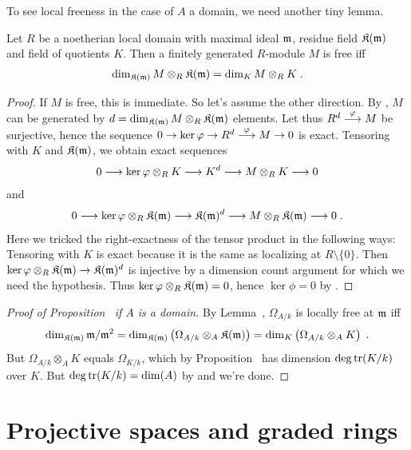 \documentclass[a4paper,parskip=half,numbers=enddot, DIV=12]{scrreprt}
\begin{document}
To see local freeness in the case of $A$ a domain, we need another tiny lemma.
\begin{lem}
	Let $R$ be a noetherian local domain with maximal ideal $\mathfrak{m}$, residue field $\mathfrak{K}(\mathfrak{m})$ and field of quotients $K$. Then a finitely generated $R$-module $M$ is free iff 
	\begin{align*}
		\dim_{\mathfrak{K}(\mathfrak{m})}M\otimes_R\mathfrak{K}(\mathfrak{m})=\dim_KM\otimes_RK\;.
	\end{align*}
\end{lem}
\begin{proof}
	If $M$ is free, this is immediate. So let's assume the other direction. By \NAK, $M$ can be generated by $d=\dim_{\mathfrak{K}(\mathfrak{m})}M\otimes_R\mathfrak{K}(\mathfrak{m})$ elements. Let thus $R^d\morphism[\phi]M$ be surjective, hence the sequence $0\morphism\ker\phi\morphism R^d\morphism[\phi]M\morphism0$ is exact. Tensoring with $K$ and $\mathfrak{K}(\mathfrak{m})$, we obtain exact sequences
	\begin{align*}
		0\morphism \ker\phi\otimes_RK\morphism K^d\morphism M\otimes_RK\morphism 0
	\end{align*}
	and
	\begin{align*}
		0\morphism\ker\phi\otimes_R\KK(\mm)\morphism\KK(\mm)^d\morphism M\otimes_R\KK(\mm)\morphism 0\;.
	\end{align*}
	Here we tricked the right-exactness of the tensor product in the following ways: Tensoring with $K$ is exact because it is the same as localizing at $R\setminus \{0\}$. Then $\ker\phi\otimes_R\KK(\mm)\morphism\KK(\mm)^d$ is injective by a dimension count argument for which we need the hypothesis. Thus $\ker\varphi\otimes_R\mathfrak{K}(\mathfrak{m})=0$, hence $\ker\phi=0$ by \NAK.
\end{proof}
\begin{proof}[Proof of Proposition~ if $A$ is a domain]
	By Lemma~, $\Omega_{A/k}$ is locally free at $\mathfrak{m}$ iff 
	\begin{align*}
		\dim_{\mathfrak{K}(\mathfrak{m})}\mathfrak{m}/\mathfrak{m}^2=\dim_{\mathfrak{K}(\mathfrak{m})}\left(\Omega_{A/k}\otimes_A\mathfrak{K}(\mathfrak{m})\right)=\dim_K\left(\Omega_{A/k}\otimes_AK\right)\;.
	\end{align*}
	But $\Omega_{A/k}\otimes_AK$ equals $\Omega_{K/k}$, which by Proposition~ has dimension $\deg\operatorname{tr}(K/k)$ over $K$. But $\deg\operatorname{tr}(K/k)=\dim(A)$ by \cite[Theorem~10]{alg1} and we're done.
\end{proof}

\chapter{Projective spaces and graded rings}
\end{document}
